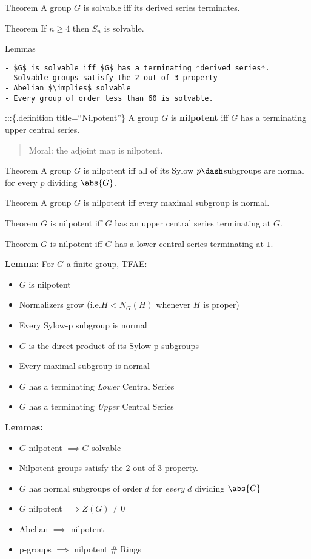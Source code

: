 Theorem A group \(G\) is solvable iff its derived series terminates.

Theorem If \(n\geq 4\) then \(S_n\) is solvable.

Lemmas \hfill

\begin{verbatim}
- $G$ is solvable iff $G$ has a terminating *derived series*.
- Solvable groups satisfy the 2 out of 3 property
- Abelian $\implies$ solvable
- Every group of order less than 60 is solvable.
\end{verbatim}

:::\{.definition title=``Nilpotent''\} A group \(G\) is
\textbf{nilpotent} iff \(G\) has a terminating upper central series.

\begin{quote}
Moral: the adjoint map is nilpotent.
\end{quote}

Theorem A group \(G\) is nilpotent iff all of its Sylow
\(p\dash\)subgroups are normal for every \(p\) dividing \(\abs{G}\).

Theorem A group \(G\) is nilpotent iff every maximal subgroup is normal.

Theorem \(G\) is nilpotent iff \(G\) has an upper central series
terminating at \(G\).

Theorem \(G\) is nilpotent iff \(G\) has a lower central series
terminating at \(1\).

\textbf{Lemma:} For \(G\) a finite group, TFAE:

\begin{itemize}
\tightlist
\item
  \(G\) is nilpotent
\item
  Normalizers grow (i.e.\(H < N_G(H)\) whenever \(H\) is proper)
\item
  Every Sylow-p subgroup is normal
\item
  \(G\) is the direct product of its Sylow p-subgroups
\item
  Every maximal subgroup is normal
\item
  \(G\) has a terminating \emph{Lower} Central Series
\item
  \(G\) has a terminating \emph{Upper} Central Series
\end{itemize}

\textbf{Lemmas:}

\begin{itemize}
\tightlist
\item
  \(G\) nilpotent \(\implies G\) solvable
\item
  Nilpotent groups satisfy the 2 out of 3 property.
\item
  \(G\) has normal subgroups of order \(d\) for \emph{every} \(d\)
  dividing \(\abs{G}\)
\item
  \(G\) nilpotent \(\implies Z(G) \neq 0\)
\item
  Abelian \(\implies\) nilpotent
\item
  p-groups \(\implies\) nilpotent \# Rings
\end{itemize}

